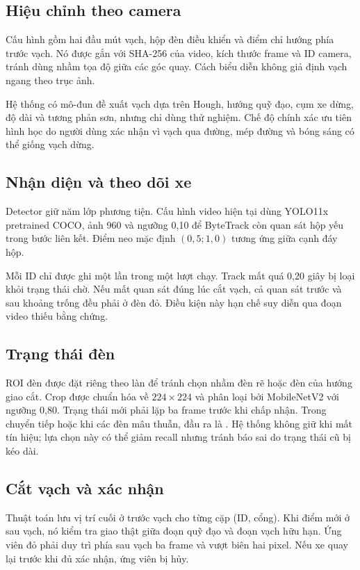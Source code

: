 \documentclass[11pt,a4paper]{article}
\newcommand{\code}[1]{{\small\texttt{\detokenize{#1}}}}
\begin{document}
\subsection{Hiệu chỉnh theo camera}
Cấu hình gồm hai đầu mút vạch, hộp đèn điều khiển và điểm chỉ hướng phía trước vạch. Nó được gắn với SHA-256 của video, kích thước frame và ID camera, tránh dùng nhầm tọa độ giữa các góc quay. Cách biểu diễn không giả định vạch ngang theo trục ảnh.

Hệ thống có mô-đun đề xuất vạch dựa trên Hough, hướng quỹ đạo, cụm xe dừng, độ dài và tương phản sơn, nhưng chỉ dùng thử nghiệm. Chế độ chính xác ưu tiên hình học do người dùng xác nhận vì vạch qua đường, mép đường và bóng sáng có thể giống vạch dừng.

\subsection{Nhận diện và theo dõi xe}
Detector giữ năm lớp phương tiện. Cấu hình video hiện tại dùng YOLO11x pretrained COCO, ảnh 960 và ngưỡng 0,10 để ByteTrack còn quan sát hộp yếu trong bước liên kết. Điểm neo mặc định $(0{,}5;1{,}0)$ tương ứng giữa cạnh đáy hộp.

Mỗi ID chỉ được ghi một lần trong một lượt chạy. Track mất quá 0,20 giây bị loại khỏi trạng thái chờ. Nếu mất quan sát đúng lúc cắt vạch, cả quan sát trước và sau khoảng trống đều phải ở đèn đỏ. Điều kiện này hạn chế suy diễn qua đoạn video thiếu bằng chứng.

\subsection{Trạng thái đèn}
ROI đèn được đặt riêng theo làn để tránh chọn nhầm đèn rẽ hoặc đèn của hướng giao cắt. Crop được chuẩn hóa về $224\times224$ và phân loại bởi MobileNetV2 với ngưỡng 0,80. Trạng thái mới phải lặp ba frame trước khi chấp nhận. Trong chuyển tiếp hoặc khi các đèn mâu thuẫn, đầu ra là \code{UNKNOWN}. Hệ thống không giữ \code{RED} khi mất tín hiệu; lựa chọn này có thể giảm recall nhưng tránh báo sai do trạng thái cũ bị kéo dài.

\subsection{Cắt vạch và xác nhận}
Thuật toán lưu vị trí cuối ở trước vạch cho từng cặp (ID, cổng). Khi điểm mới ở sau vạch, nó kiểm tra giao thật giữa đoạn quỹ đạo và đoạn vạch hữu hạn. Ứng viên đỏ phải duy trì phía sau vạch ba frame và vượt biên hai pixel. Nếu xe quay lại trước khi đủ xác nhận, ứng viên bị hủy.
\end{document}
